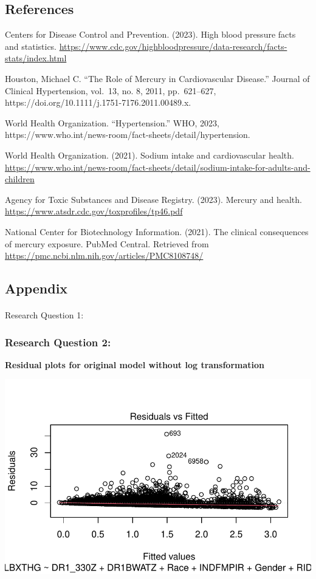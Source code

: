\documentclass[
  letterpaper,
  DIV=11,
  numbers=noendperiod]{scrartcl}
\makeatletter
\let\oldparagraph\paragraph
\renewcommand{\paragraph}{
    \@ifstar
      \xxxParagraphStar
      \xxxParagraphNoStar
  }
\newcommand{\xxxParagraphStar}[1]{\oldparagraph*{#1}\mbox{}}
\newcommand{\xxxParagraphNoStar}[1]{\oldparagraph{#1}\mbox{}}
\makeatother
\begin{document}
\subsection{References}\label{references}

Centers for Disease Control and Prevention. (2023). High blood pressure
facts and statistics.
\url{https://www.cdc.gov/highbloodpressure/data-research/facts-stats/index.html}

Houston, Michael C. ``The Role of Mercury in Cardiovascular Disease.''
Journal of Clinical Hypertension, vol.~13, no. 8, 2011, pp.~621--627,
https://doi.org/10.1111/j.1751-7176.2011.00489.x.

World Health Organization. ``Hypertension.'' WHO, 2023,
https://www.who.int/news-room/fact-sheets/detail/hypertension.

World Health Organization. (2021). Sodium intake and cardiovascular
health.
\url{https://www.who.int/news-room/fact-sheets/detail/sodium-intake-for-adults-and-children}

Agency for Toxic Substances and Disease Registry. (2023). Mercury and
health. \url{https://www.atsdr.cdc.gov/toxprofiles/tp46.pdf}

National Center for Biotechnology Information. (2021). The clinical
consequences of mercury exposure. PubMed Central. Retrieved from
\url{https://pmc.ncbi.nlm.nih.gov/articles/PMC8108748/}

\subsection{Appendix}\label{appendix}

\paragraph{Research Question 1:}\label{research-question-1}

\subsubsection{Research Question 2:}\label{research-question-2}

\textbf{Residual plots for original model without log transformation}

\includegraphics{_IDS702_Final_Report_Feedback_files/figure-pdf/unnamed-chunk-18-1.pdf}
\end{document}
